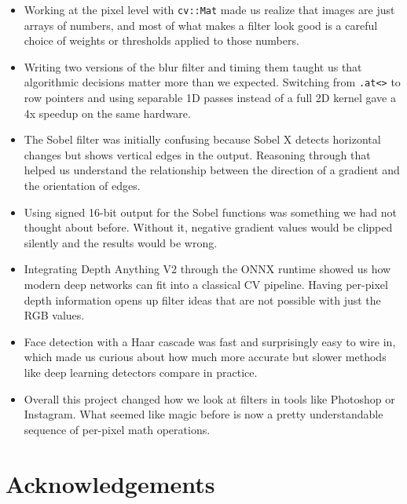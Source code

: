 \documentclass[11pt,letterpaper]{article}
\begin{document}
\begin{itemize}
    \item Working at the pixel level with \texttt{cv::Mat} made us realize
        that images are just arrays of numbers, and most of what makes a
        filter look good is a careful choice of weights or thresholds applied
        to those numbers.
    \item Writing two versions of the blur filter and timing them taught us
        that algorithmic decisions matter more than we expected. Switching from
        \texttt{.at<>} to row pointers and using separable 1D passes instead
        of a full 2D kernel gave a 4x speedup on the same hardware.
    \item The Sobel filter was initially confusing because Sobel X detects
        horizontal changes but shows vertical edges in the output. Reasoning
        through that helped us understand the relationship between the direction
        of a gradient and the orientation of edges.
    \item Using signed 16-bit output for the Sobel functions was something we
        had not thought about before. Without it, negative gradient values
        would be clipped silently and the results would be wrong.
    \item Integrating Depth Anything V2 through the ONNX runtime showed us
        how modern deep networks can fit into a classical CV pipeline. Having
        per-pixel depth information opens up filter ideas that are not possible
        with just the RGB values.
    \item Face detection with a Haar cascade was fast and surprisingly easy
        to wire in, which made us curious about how much more accurate but
        slower methods like deep learning detectors compare in practice.
    \item Overall this project changed how we look at filters in tools like
        Photoshop or Instagram. What seemed like magic before is now a pretty
        understandable sequence of per-pixel math operations.
\end{itemize}

\section*{Acknowledgements}
\end{document}
